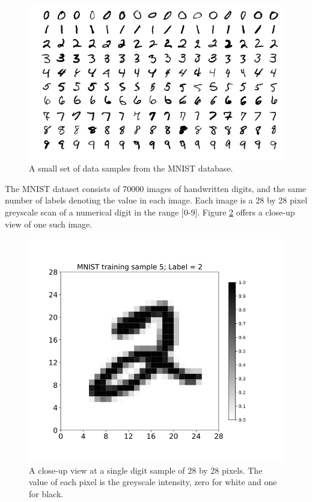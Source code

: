 \documentclass[sigplan, review=false, screen=true, balance=true]{acmart}
\begin{document}
\begin{figure}[H]
  \centering
  \includegraphics[width=\columnwidth]{../figures/mnist_examples.png}
  \caption{A small set of data samples from the MNIST database.}
  \label{fig_mnist_examples}
\end{figure}

The MNIST dataset consists of 70000 images of handwritten digits, and the
same number of labels denoting the value in each image. Each image is a
28 by 28 pixel greyscale scan of a numerical digit in the range [0-9].
Figure \ref{fig_mnist_example_digit} offers a close-up view of one such image.

\begin{figure}[H]
  \centering
  \includegraphics[width=\columnwidth]{../figures/mnist_example_digit.png}
  \caption{A close-up view at a single digit sample of 28 by 28 pixels.
           The value of each pixel is the greyscale intensity, zero for white
           and one for black.}
  \label{fig_mnist_example_digit}
\end{figure}
\end{document}
